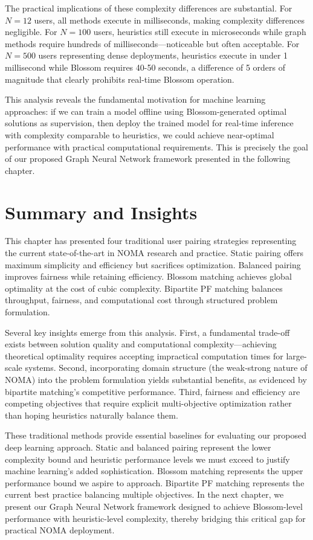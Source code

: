 The practical implications of these complexity differences are substantial. For $N = 12$ users, all methods execute in milliseconds, making complexity differences negligible. For $N = 100$ users, heuristics still execute in microseconds while graph methods require hundreds of milliseconds—noticeable but often acceptable. For $N = 500$ users representing dense deployments, heuristics execute in under 1 millisecond while Blossom requires 40-50 seconds, a difference of 5 orders of magnitude that clearly prohibits real-time Blossom operation.

This analysis reveals the fundamental motivation for machine learning approaches: if we can train a model offline using Blossom-generated optimal solutions as supervision, then deploy the trained model for real-time inference with complexity comparable to heuristics, we could achieve near-optimal performance with practical computational requirements. This is precisely the goal of our proposed Graph Neural Network framework presented in the following chapter.

\section{Summary and Insights}

This chapter has presented four traditional user pairing strategies representing the current state-of-the-art in NOMA research and practice. Static pairing offers maximum simplicity and efficiency but sacrifices optimization. Balanced pairing improves fairness while retaining efficiency. Blossom matching achieves global optimality at the cost of cubic complexity. Bipartite PF matching balances throughput, fairness, and computational cost through structured problem formulation.

Several key insights emerge from this analysis. First, a fundamental trade-off exists between solution quality and computational complexity—achieving theoretical optimality requires accepting impractical computation times for large-scale systems. Second, incorporating domain structure (the weak-strong nature of NOMA) into the problem formulation yields substantial benefits, as evidenced by bipartite matching's competitive performance. Third, fairness and efficiency are competing objectives that require explicit multi-objective optimization rather than hoping heuristics naturally balance them.

These traditional methods provide essential baselines for evaluating our proposed deep learning approach. Static and balanced pairing represent the lower complexity bound and heuristic performance levels we must exceed to justify machine learning's added sophistication. Blossom matching represents the upper performance bound we aspire to approach. Bipartite PF matching represents the current best practice balancing multiple objectives. In the next chapter, we present our Graph Neural Network framework designed to achieve Blossom-level performance with heuristic-level complexity, thereby bridging this critical gap for practical NOMA deployment.
